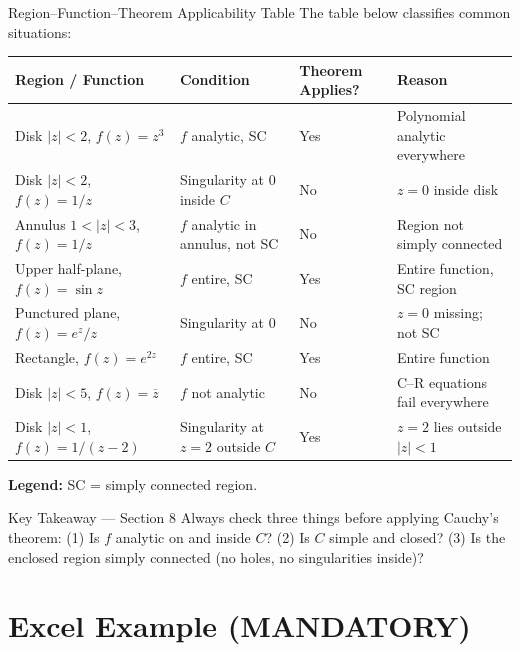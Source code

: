 \documentclass[12pt,a4paper]{article}
\begin{document}
\begin{infobox}{Region--Function--Theorem Applicability Table}
The table below classifies common situations:

\begin{center}
\begin{tabular}{p{4.2cm} p{3.2cm} p{2.2cm} p{4.5cm}}
\toprule
\textbf{Region / Function} & \textbf{Condition} & \textbf{Theorem Applies?} & \textbf{Reason} \\
\midrule
Disk $|z|<2$, $f(z)=z^3$ & $f$ analytic, SC & Yes & Polynomial analytic everywhere \\
\addlinespace
Disk $|z|<2$, $f(z)=1/z$ & Singularity at $0$ inside $C$ & No & $z=0$ inside disk \\
\addlinespace
Annulus $1<|z|<3$, $f(z)=1/z$ & $f$ analytic in annulus, not SC & No & Region not simply connected \\
\addlinespace
Upper half-plane, $f(z)=\sin z$ & $f$ entire, SC & Yes & Entire function, SC region \\
\addlinespace
Punctured plane, $f(z)=e^z/z$ & Singularity at $0$ & No & $z=0$ missing; not SC \\
\addlinespace
Rectangle, $f(z)=e^{2z}$ & $f$ entire, SC & Yes & Entire function \\
\addlinespace
Disk $|z|<5$, $f(z)=\overline{z}$ & $f$ not analytic & No & C--R equations fail everywhere \\
\addlinespace
Disk $|z|<1$, $f(z)=1/(z-2)$ & Singularity at $z=2$ outside $C$ & Yes & $z=2$ lies outside $|z|<1$ \\
\bottomrule
\end{tabular}
\end{center}

\textbf{Legend:} SC = simply connected region.
\end{infobox}

\begin{learnbox}{Key Takeaway --- Section 8}
Always check three things before applying Cauchy's theorem:
(1) Is $f$ analytic on and inside $C$?
(2) Is $C$ simple and closed?
(3) Is the enclosed region simply connected (no holes, no singularities inside)?
\end{learnbox}

\section{Excel Example (MANDATORY)}
\end{document}
